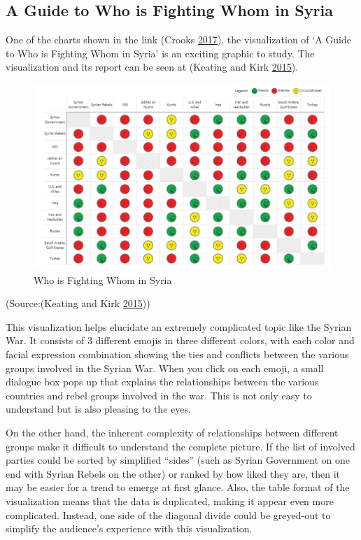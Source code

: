 \documentclass[]{book}
\theoremstyle{definition}
\theoremstyle{definition}
\theoremstyle{definition}
\theoremstyle{remark}
\begin{document}
\subsection{A Guide to Who is Fighting Whom in
Syria}\label{a-guide-to-who-is-fighting-whom-in-syria}

One of the charts shown in the link (Crooks
\protect\hyperlink{ref-int_viz_capt}{2017}), the visualization of `A
Guide to Who is Fighting Whom in Syria' is an exciting graphic to study.
The visualization and its report can be seen at (Keating and Kirk
\protect\hyperlink{ref-syria_chart}{2015}).

\begin{figure}
\centering
\includegraphics{images/img_syria_summary.PNG}
\caption{Who is Fighting Whom in Syria}
\end{figure}

(Source:(Keating and Kirk \protect\hyperlink{ref-syria_chart}{2015}))

This visualization helps elucidate an extremely complicated topic like
the Syrian War. It consists of 3 different emojis in three different
colors, with each color and facial expression combination showing the
ties and conflicts between the various groups involved in the Syrian
War. When you click on each emoji, a small dialogue box pops up that
explains the relationships between the various countries and rebel
groups involved in the war. This is not only easy to understand but is
also pleasing to the eyes.

On the other hand, the inherent complexity of relationships between
different groups make it difficult to understand the complete picture.
If the list of involved parties could be sorted by simplified ``sides''
(such as Syrian Government on one end with Syrian Rebels on the other)
or ranked by how liked they are, then it may be easier for a trend to
emerge at first glance. Also, the table format of the visualization
means that the data is duplicated, making it appear even more
complicated. Instead, one side of the diagonal divide could be
greyed-out to simplify the audience's experience with this
visualization.
\end{document}
